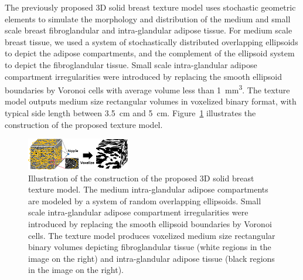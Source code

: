 \documentclass[journal]{IEEEtran}
\begin{document}

The previously proposed 3D solid breast texture model uses stochastic
geometric elements to simulate the morphology and distribution of the
medium and small scale breast fibroglandular and intra-glandular
adipose tissue. For medium scale breast tissue, we used a system of
stochastically distributed overlapping ellipsoids to depict the
adipose compartments, and the complement of the ellipsoid system to
depict the fibroglandular tissue. Small scale intra-glandular adipose
compartment irregularities were introduced by replacing the smooth
ellipsoid boundaries by Voronoi cells with average volume less than
\SI{1}{\mm\cubed}. The texture model outputs medium size rectangular
volumes in voxelized binary format, with typical side length between
\SI{3.5}{\cm} and \SI{5}{\cm}. Figure~\ref{fig:model} illustrates the
construction of the proposed texture model.

\begin{figure}[!htbp]
  \centering
  \includegraphics[width=0.4\textwidth]{model}
  \caption{Illustration of the construction of the proposed 3D solid
    breast texture model. The medium intra-glandular adipose
    compartments are modeled by a system of random overlapping
    ellipsoids. Small scale intra-glandular adipose compartment
    irregularities were introduced by replacing the smooth ellipsoid
    boundaries by Voronoi cells. The texture model produces voxelized
    medium size rectangular binary volumes depicting fibroglandular
    tissue (white regions in the image on the right) and
    intra-glandular adipose tissue (black regions in the image on the
    right).}
  \label{fig:model}
\end{figure}
\end{document}
